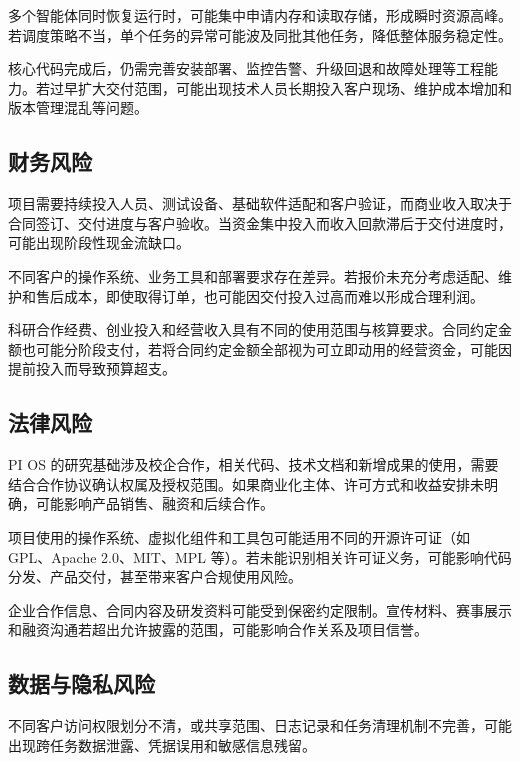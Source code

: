多个智能体同时恢复运行时，可能集中申请内存和读取存储，形成瞬时资源高峰。若调度策略不当，单个任务的异常可能波及同批其他任务，降低整体服务稳定性。

核心代码完成后，仍需完善安装部署、监控告警、升级回退和故障处理等工程能力。若过早扩大交付范围，可能出现技术人员长期投入客户现场、维护成本增加和版本管理混乱等问题。

\subsection{财务风险}\label{sec:7.1.3}
项目需要持续投入人员、测试设备、基础软件适配和客户验证，而商业收入取决于合同签订、交付进度与客户验收。当资金集中投入而收入回款滞后于交付进度时，可能出现阶段性现金流缺口。

不同客户的操作系统、业务工具和部署要求存在差异。若报价未充分考虑适配、维护和售后成本，即使取得订单，也可能因交付投入过高而难以形成合理利润。

科研合作经费、创业投入和经营收入具有不同的使用范围与核算要求。合同约定金额也可能分阶段支付，若将合同约定金额全部视为可立即动用的经营资金，可能因提前投入而导致预算超支。

\subsection{法律风险}\label{sec:7.1.4}
PI OS 的研究基础涉及校企合作，相关代码、技术文档和新增成果的使用，需要结合合作协议确认权属及授权范围。如果商业化主体、许可方式和收益安排未明确，可能影响产品销售、融资和后续合作。

项目使用的操作系统、虚拟化组件和工具包可能适用不同的开源许可证（如 GPL、Apache 2.0、MIT、MPL 等）。若未能识别相关许可证义务，可能影响代码分发、产品交付，甚至带来客户合规使用风险。

企业合作信息、合同内容及研发资料可能受到保密约定限制。宣传材料、赛事展示和融资沟通若超出允许披露的范围，可能影响合作关系及项目信誉。

\subsection{数据与隐私风险}\label{sec:7.1.5}
不同客户访问权限划分不清，或共享范围、日志记录和任务清理机制不完善，可能出现跨任务数据泄露、凭据误用和敏感信息残留。

